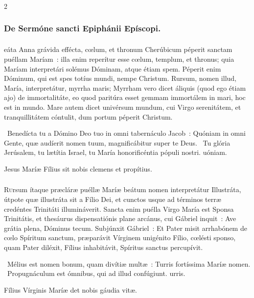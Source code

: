 \documentclass[9pt,twoside]{extarticle}
\begin{document}
\begin{multicols}{2}
\subsubsection*{\center De Sermóne sancti Epiphánii Epíscopi.}
\subsubsection*{\center {}}
eáta Anna grávida effécta, cœlum, et thronum Cherúbicum péperit sanctam puéllam Maríam~: illa enim reperítur esse cœlum, templum, et thronus; quia Maríam interpretári solémus Dóminam, atque étiam spem. Péperit enim Dóminum, qui est spes totíus mundi, nempe Christum. Rursum, nomen illud, María, interpretátur, myrrha maris; Myrrham vero dicet áliquis (quod ego étiam ajo) de immortalitáte, eo quod paritúra esset gemmam immortálem in mari, hoc est in mundo. Mare autem dicet univérsum mundum, cui Virgo serenitátem, et tranquillitátem cóntulit, dum portum péperit Christum.

\begin{tightlist}{}
\item {}~Benedícta tu a Dómino Deo tuo in omni tabernáculo Jacob~: \textred{*} Quóniam in omni Gente, quæ audíerit nomen tuum, magnificábitur super te Deus. ~Tu glória Jerúsalem, tu lætítia Israel, tu María honorificéntia pópuli nostri. uóniam.
\item {\small {} Jesus Maríæ Fílius sit nobis clemens et propítius.}
\end{tightlist}

\subsubsection*{\center {}}
\lettrine{R}ursum ítaque præcláræ puéllæ Maríæ beátum nomen interpretátur Illustráta, útpote quæ illustráta sit a Fílio Dei, et cunctos usque ad términos terræ credéntes Trinitáti illumináverit. Sancta enim puélla Virgo María est Sponsa Trinitátis, et thesáurus dispensatiónis plane arcánus, cui Gábriel inquit~: Ave grátia plena, Dóminus tecum. Subjúnxit Gábriel~: Et Pater misit arrhabónem de cœlo Spíritum sanctum, præparávit Vírginem unigénito Fílio, cœlésti sponso, quam Pater diléxit, Fílius inhabitávit, Spíritus sanctus percupívit.

\begin{tightlist}{}
\item {}~Mélius est nomen bonum, quam divítiæ multæ~: \textred{*} Turris fortíssima Maríæ nomen. ~Propugnáculum est ómnibus, qui ad illud confúgiunt. urris.
\item {\small {} Fílius Vírginis Maríæ det nobis gáudia vitæ.}
\end{tightlist}


\end{multicols}
\end{document}
